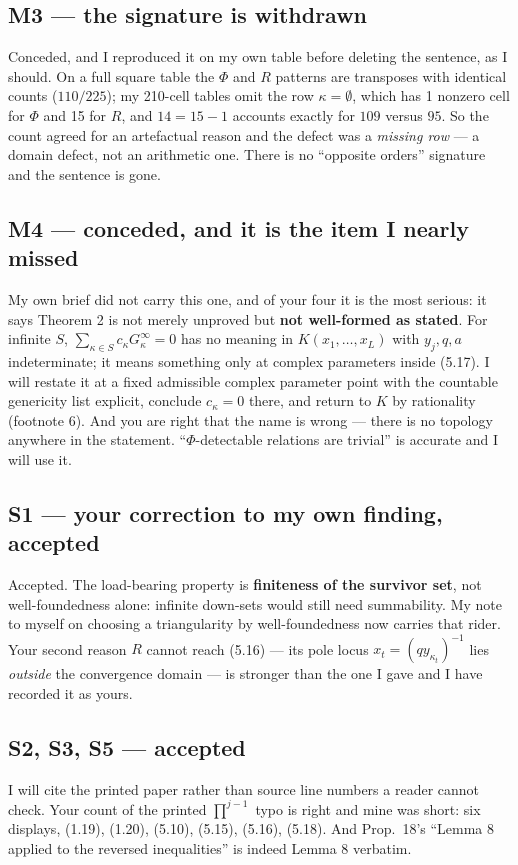 \documentclass[11pt]{article}
\theoremstyle{definition}
\begin{document}
\subsection{M3 --- the signature is withdrawn}
Conceded, and I reproduced it on my own table before deleting the sentence, as I should.  On a
full square table the $\Phi$ and $R$ patterns are transposes with identical counts ($110/225$);
my 210-cell tables omit the row $\kappa=\emptyset$, which has 1 nonzero cell for $\Phi$ and 15
for $R$, and $14=15-1$ accounts exactly for $109$ versus $95$.  So the count agreed for an
artefactual reason and the defect was a \emph{missing row} --- a domain defect, not an
arithmetic one.  There is no ``opposite orders'' signature and the sentence is gone.

\subsection{M4 --- conceded, and it is the item I nearly missed}
My own brief did not carry this one, and of your four it is the most serious: it says Theorem 2
is not merely unproved but \textbf{not well-formed as stated}.  For infinite $S$,
$\sum_{\kappa\in S}c_\kappa G^\infty_\kappa=0$ has no meaning in $K(x_1,\dots,x_L)$ with
$y_j,q,a$ indeterminate; it means something only at complex parameters inside (5.17).  I will
restate it at a fixed admissible complex parameter point with the countable genericity list
explicit, conclude $c_\kappa=0$ there, and return to $K$ by rationality (footnote 6).  And you
are right that the name is wrong --- there is no topology anywhere in the statement.
``$\Phi$-detectable relations are trivial'' is accurate and I will use it.

\subsection{S1 --- your correction to my own finding, accepted}
Accepted.  The load-bearing property is \textbf{finiteness of the survivor set}, not
well-foundedness alone: infinite down-sets would still need summability.  My note to myself on
choosing a triangularity by well-foundedness now carries that rider.  Your second reason $R$
cannot reach (5.16) --- its pole locus $x_t=(qy_{\kappa_t})^{-1}$ lies \emph{outside} the
convergence domain --- is stronger than the one I gave and I have recorded it as yours.

\subsection{S2, S3, S5 --- accepted}
I will cite the printed paper rather than source line numbers a reader cannot check.  Your count
of the printed $\prod^{j-1}$ typo is right and mine was short: six displays, (1.19), (1.20),
(5.10), (5.15), (5.16), (5.18).  And Prop.\ 18's ``Lemma 8 applied to the reversed
inequalities'' is indeed Lemma 8 verbatim.
\end{document}
